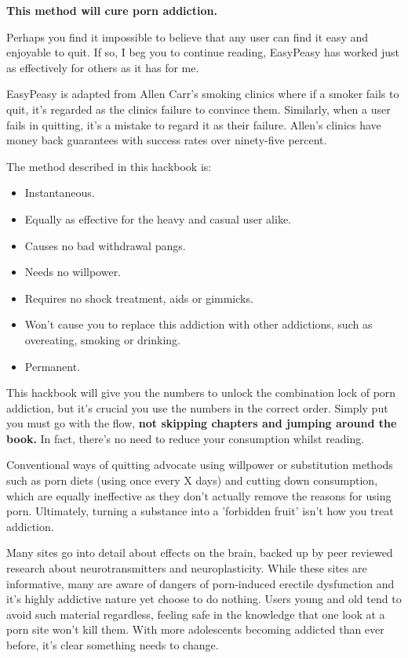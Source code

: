 \documentclass[easypeasy.tex]{subfiles}
\begin{document}
{\large\bfseries This method will cure porn addiction.}

Perhaps you find it impossible to believe that any user can find it easy and enjoyable to quit. If so, I beg you to continue reading, EasyPeasy has worked just as effectively for others as it has for me.

EasyPeasy is adapted from Allen Carr's smoking clinics where if a smoker fails to quit, it's regarded as the clinics failure to convince them. Similarly, when a user fails in quitting, it's a mistake to regard it as their failure. Allen's clinics have money back guarantees with success rates over ninety-five percent.

The method described in this hackbook is:
\begin{itemize}
  \item Instantaneous.
  \item Equally as effective for the heavy and casual user alike.
  \item Causes no bad withdrawal pangs.
  \item Needs no willpower.
  \item Requires no shock treatment, aids or gimmicks.
  \item Won't cause you to replace this addiction with other addictions, such as overeating, smoking or drinking.
  \item Permanent.
\end{itemize}

This hackbook will give you the numbers to unlock the combination lock of porn addiction, but it's crucial you use the numbers in the correct order. Simply put you must go with the flow, \textbf{not skipping chapters and jumping around the book.} In fact, there's no need to reduce your consumption whilst reading.

Conventional ways of quitting advocate using willpower or substitution methods such as porn diets (using once every X days) and cutting down consumption, which are equally ineffective as they don't actually remove the reasons for using porn. Ultimately, turning a substance into a 'forbidden fruit' isn't how you treat addiction.

Many sites go into detail about effects on the brain, backed up by peer reviewed research about neurotransmitters and neuroplasticity. While these sites are informative, many are aware of dangers of porn-induced erectile dysfunction and it's highly addictive nature yet choose to do nothing. Users young and old tend to avoid such material regardless, feeling safe in the knowledge that one look at a porn site won't kill them. With more adolescents becoming addicted than ever before, it's clear something needs to change.
\end{document}
